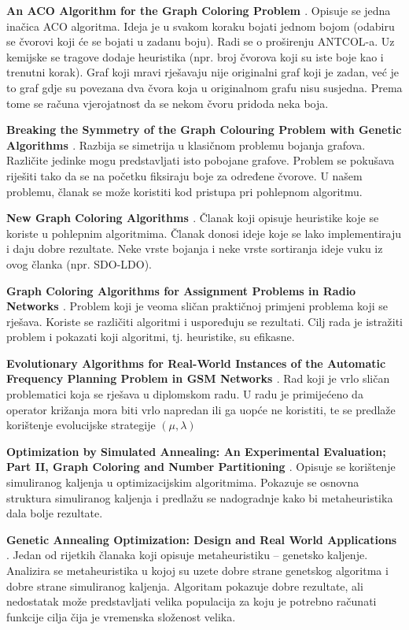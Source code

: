 \documentclass[times, utf8, diplomski, numeric]{fer}
\begin{document}
\textbf{An ACO Algorithm for the Graph Coloring Problem \cite{lit4}}.
Opisuje se jedna inačica ACO  algoritma. Ideja je u svakom koraku bojati 
jednom bojom (odabiru se čvorovi koji će se bojati u zadanu boju). Radi se o 
proširenju ANTCOL-a. Uz kemijske se tragove dodaje heuristika (npr. 
broj čvorova koji su iste boje kao i trenutni korak). Graf koji mravi rješavaju
nije originalni graf koji je zadan, već je to graf gdje su povezana dva čvora
koja u originalnom grafu nisu susjedna. Prema tome se računa vjerojatnost da 
se nekom čvoru pridoda neka boja. 


\textbf{Breaking the Symmetry of the Graph Colouring Problem with Genetic Algorithms \cite{lit5}}.
Razbija se simetrija u klasičnom problemu bojanja grafova. Različite jedinke mogu predstavljati isto pobojane grafove. Problem se pokušava riješiti tako  da se na početku fiksiraju boje za određene čvorove. U našem problemu, članak se može koristiti kod pristupa pri pohlepnom algoritmu.

\textbf{New Graph Coloring Algorithms \cite{lit7}}.
Članak koji opisuje heuristike koje se koriste u pohlepnim algoritmima. Članak donosi ideje koje se lako implementiraju i daju dobre rezultate. Neke vrste bojanja i neke vrste sortiranja ideje vuku iz ovog članka (npr. SDO-LDO).

\textbf{Graph Coloring Algorithms for Assignment Problems in Radio Networks \cite{lit10}}.
Problem koji je veoma sličan praktičnoj primjeni problema koji se rješava. Koriste se različiti algoritmi i uspoređuju se rezultati. Cilj rada je istražiti problem i pokazati koji algoritmi, tj. heuristike, su efikasne.

\textbf{Evolutionary Algorithms for Real-World Instances of the Automatic Frequency Planning Problem in GSM Networks \cite{lit12}}.
Rad koji je vrlo sličan problematici koja se rješava u diplomskom radu. U radu je primijećeno da operator križanja mora biti vrlo napredan ili ga uopće ne koristiti, te se predlaže korištenje evolucijske strategije $(\mu, \lambda)$ 

\textbf{Optimization by Simulated Annealing: An Experimental Evaluation; Part II, Graph Coloring and Number Partitioning \cite{lit13}}.
Opisuje se korištenje simuliranog kaljenja u optimizacijskim algoritmima. Pokazuje se osnovna struktura simuliranog kaljenja i predlažu se nadogradnje kako bi metaheuristika dala bolje rezultate.

\textbf{Genetic Annealing Optimization: Design and Real World Applications \cite{lit18}}.
Jedan od rijetkih članaka koji opisuje metaheuristiku -- genetsko kaljenje. Analizira se metaheuristika u kojoj su uzete dobre strane genetskog algoritma i dobre strane simuliranog kaljenja. Algoritam pokazuje dobre rezultate, ali nedostatak može predstavljati velika populacija za koju je potrebno računati funkcije cilja čija je vremenska složenost velika.
\end{document}
